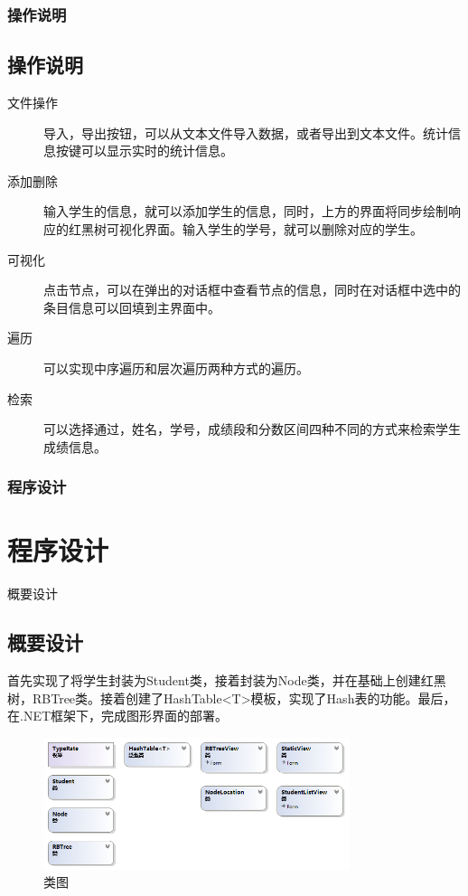\documentclass{beamer}
\begin{document}
\begin{frame}
\frametitle{操作说明}
\subsection{操作说明}
\begin{description}
\item[文件操作]
导入，导出按钮，可以从文本文件导入数据，或者导出到文本文件。统计信息按键可以显示实时的统计信息。
\item[添加删除]
输入学生的信息，就可以添加学生的信息，同时，上方的界面将同步绘制响应的红黑树可视化界面。输入学生的学号，就可以删除对应的学生。
\item[可视化]
点击节点，可以在弹出的对话框中查看节点的信息，同时在对话框中选中的条目信息可以回填到主界面中。
\item[遍历]
可以实现中序遍历和层次遍历两种方式的遍历。
\item[检索]
可以选择通过，姓名，学号，成绩段和分数区间四种不同的方式来检索学生成绩信息。
\end{description}
\end{frame}

\begin{frame}
\frametitle{程序设计}
\section{程序设计}
\begin{block}{概要设计}
\subsection{概要设计}
首先实现了将学生封装为Student类，接着封装为Node类，并在基础上创建红黑树，RBTree类。接着创建了HashTable<T>模板，实现了Hash表的功能。最后，在.NET框架下，完成图形界面的部署。
\end{block}
\begin{figure}[H]
\centering
\includegraphics[width=0.8\textwidth]{1.png}
\caption{类图} 
\end{figure}
\end{frame}
\end{document}
